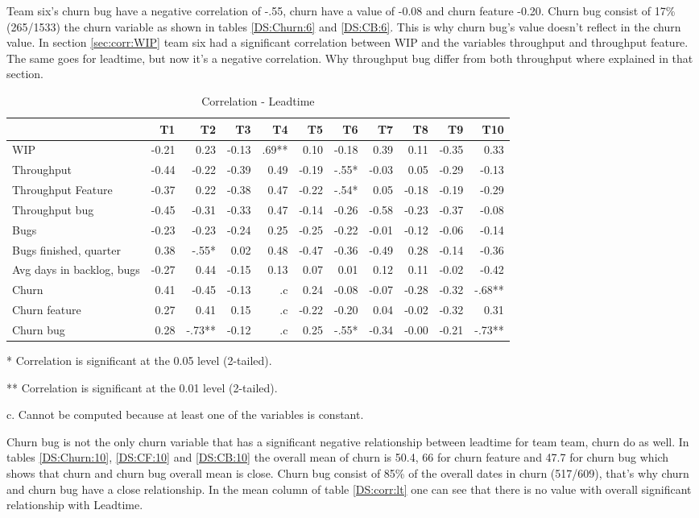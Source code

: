 \documentclass[UKenglish]{ifimaster}  %
\begin{document}
Team six's churn bug have a negative correlation of -.55, churn have a value of -0.08 and churn feature -0.20. Churn bug consist of 17\% (265/1533) the churn variable as shown in tables \ref{DS:Churn:6} and \ref{DS:CB:6}. This is why churn bug's value doesn't reflect in the churn value. In section \ref{sec:corr:WIP} team six had a significant correlation between WIP and the variables throughput and throughput feature. The same goes for leadtime, but now it's a negative correlation. Why throughput bug differ from both throughput where explained in that section. 
\begin{table}[!htbp]
 \begin{adjustwidth}{-2.5cm}{}
 \centering
 \begin{tabular}{|l|r|r|r|r|r|r|r|r|r|r|}
\hline
 & T1 & T2 & T3 & T4 & T5 & T6 & T7 & T8 & T9 & T10\\ \hline
WIP &-0.21& 0.23& -0.13& .69**& 0.10& -0.18& 0.39& 0.11& -0.35& 0.33\\ \hline
Throughput &-0.44& -0.22& -0.39& 0.49& -0.19& -.55*& -0.03& 0.05& -0.29& -0.13\\ \hline
Throughput Feature &-0.37& 0.22& -0.38& 0.47& -0.22& -.54*& 0.05& -0.18& -0.19& -0.29\\ \hline
Throughput bug &-0.45& -0.31& -0.33& 0.47& -0.14& -0.26& -0.58& -0.23& -0.37& -0.08\\ \hline
Bugs &-0.23& -0.23& -0.24& 0.25& -0.25& -0.22& -0.01& -0.12& -0.06& -0.14\\ \hline
Bugs finished, quarter &0.38& -.55*& 0.02& 0.48& -0.47& -0.36& -0.49& 0.28& -0.14& -0.36\\ \hline
Avg days in backlog, bugs &-0.27& 0.44& -0.15& 0.13& 0.07& 0.01& 0.12& 0.11& -0.02& -0.42\\ \hline
Churn &0.41& -0.45& -0.13& .c& 0.24& -0.08& -0.07& -0.28& -0.32& -.68**\\ \hline
Churn feature &0.27& 0.41& 0.15& .c& -0.22& -0.20& 0.04& -0.02& -0.32& 0.31\\ \hline
Churn bug &0.28& -.73**
& -0.12& .c
& 0.25& -.55*
& -0.34& -0.00& -0.21& -.73**
\\ \hline
\end{tabular}
 \caption{Correlation - Leadtime}
 \label{corr:Leadtime}
 \centerline {* Correlation is significant at the 0.05 level (2-tailed).}
\centerline{** Correlation is significant at the 0.01 level (2-tailed).}
\centerline{c. Cannot be computed because at least one of the variables is constant.}
\end{adjustwidth}
\end{table}
Churn bug is not the only churn variable that has a significant negative relationship between leadtime for team team, churn do as well. In tables \ref{DS:Churn:10}, \ref{DS:CF:10} and \ref{DS:CB:10} the overall mean of churn is 50.4, 66 for churn feature and 47.7 for churn bug which shows that churn and churn bug overall mean is close. Churn bug consist of 85\% of the overall dates in churn (517/609), that's why churn and churn bug have a close relationship. In the mean column of table \ref{DS:corr:lt} one can see that there is no value with overall significant relationship with Leadtime.
\end{document}
